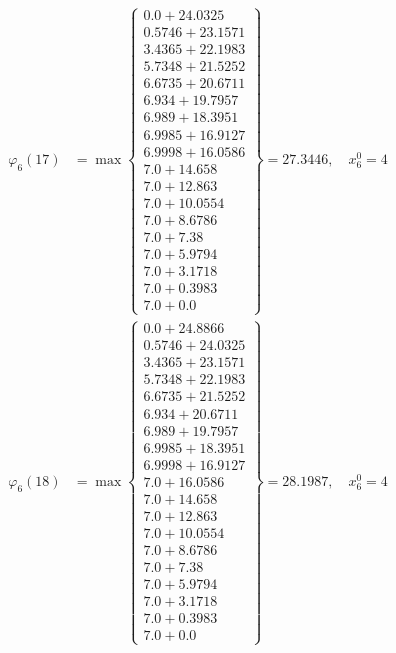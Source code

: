\documentclass{article}
\begin{document}
\begin{align*}
  
\varphi_{6}(17) &= \max \left\{ \begin{array}{c}
0.0 + 24.0325 \\
 0.5746 + 23.1571 \\
 3.4365 + 22.1983 \\
 5.7348 + 21.5252 \\
 6.6735 + 20.6711 \\
 6.934 + 19.7957 \\
 6.989 + 18.3951 \\
 6.9985 + 16.9127 \\
 6.9998 + 16.0586 \\
 7.0 + 14.658 \\
 7.0 + 12.863 \\
 7.0 + 10.0554 \\
 7.0 + 8.6786 \\
 7.0 + 7.38 \\
 7.0 + 5.9794 \\
 7.0 + 3.1718 \\
 7.0 + 0.3983 \\
 7.0 + 0.0
\end{array} \right\}=27.3446,\quad x_{6}^0=4\\
  
  
  
  
\varphi_{6}(18) &= \max \left\{ \begin{array}{c}
0.0 + 24.8866 \\
 0.5746 + 24.0325 \\
 3.4365 + 23.1571 \\
 5.7348 + 22.1983 \\
 6.6735 + 21.5252 \\
 6.934 + 20.6711 \\
 6.989 + 19.7957 \\
 6.9985 + 18.3951 \\
 6.9998 + 16.9127 \\
 7.0 + 16.0586 \\
 7.0 + 14.658 \\
 7.0 + 12.863 \\
 7.0 + 10.0554 \\
 7.0 + 8.6786 \\
 7.0 + 7.38 \\
 7.0 + 5.9794 \\
 7.0 + 3.1718 \\
 7.0 + 0.3983 \\
 7.0 + 0.0
\end{array} \right\}=28.1987,\quad x_{6}^0=4\\
  

\end{align*}
\end{document}
